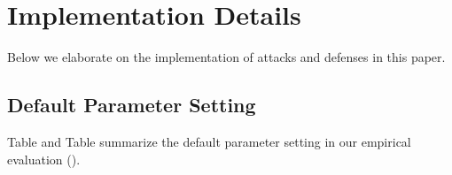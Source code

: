 \documentclass[compsoc,conference,a4paper,10pt,times]{IEEEtran}
\begin{document}
\newpage



\newpage
\appendices

\section{Implementation Details}
\label{sec:details}

Below we elaborate on the implementation of attacks and defenses in this paper.







\subsection{Default Parameter Setting}


Table and Table summarize the default parameter setting in our empirical evaluation ().
\end{document}
